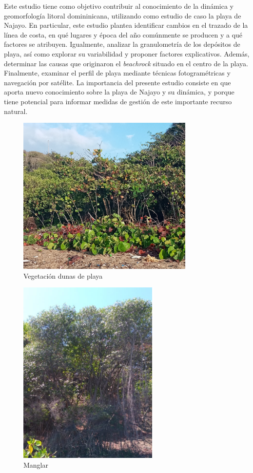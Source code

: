 \documentclass[11pt,]{article}
\begin{document}
Este estudio tiene como objetivo contribuir al conocimiento de la
dinámica y geomorfología litoral domininicana, utilizando como estudio
de caso la playa de Najayo. En particular, este estudio plantea
identificar cambios en el trazado de la línea de costa, en qué lugares y
época del año comúnmente se producen y a qué factores se atribuyen.
Igualmente, analizar la granulometría de los depósitos de playa, así
como explorar su variabilidad y proponer factores explicativos. Además,
determinar las causas que originaron el \emph{beachrock} situado en el
centro de la playa. Finalmente, examinar el perfil de playa mediante
técnicas fotogramétricas y navegación por satélite. La importancia del
presente estudio consiste en que aporta nuevo conocimiento sobre la
playa de Najayo y su dinámica, y porque tiene potencial para informar
medidas de gestión de este importante recurso natural.

\begin{figure}
\centering
\includegraphics[height=3.12500in]{Cocoloba_uvifera.jpg}
\caption{Vegetación dunas de playa\label{cocoloba}}
\end{figure}

\begin{figure}
\centering
\includegraphics[height=3.64583in]{mangle_rojo.png}
\caption{Manglar\label{manglerojo}}
\end{figure}
\end{document}
